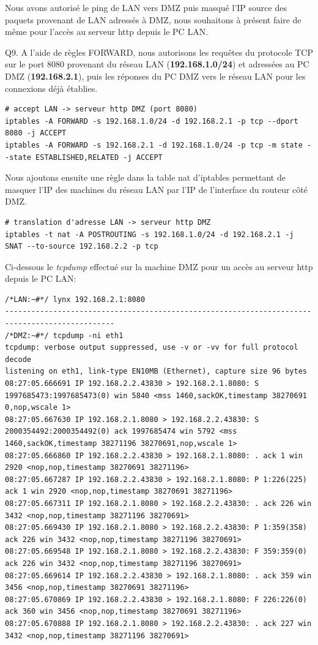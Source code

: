 \documentclass[frenchb, 11pt]{article}
\newlength{\leftbarwidth}
\newlength{\leftbarsep}
\newcommand*{\leftbarcolorcmd}{\color{leftbarcolor}} %
\renewenvironment{leftbar}{%
    \def\FrameCommand{{\leftbarcolorcmd{\vrule width \leftbarwidth\relax\hspace {\leftbarsep}}}}%
    \MakeFramed {\advance \hsize -\width \FrameRestore }%
}{%
    \endMakeFramed
}
\begin{document}
Nous avons autorisé le ping de LAN vers DMZ puis masqué l'IP source des paquets provenant de LAN adressés à DMZ, nous souhaitons à présent faire de même pour l'accès au serveur http depuis le PC LAN.

\begin{leftbar}
	\noindent Q9. A l'aide de règles FORWARD, nous autorisons les requêtes du protocole TCP sur le port 8080 provenant du réseau LAN (\textbf{192.168.1.0/24}) et adressées au PC DMZ (\textbf{192.168.2.1}), puis les réponses du PC DMZ vers le réseau LAN pour les connexions déjà établies.
	\begin{lstlisting}[numbers=none]
# accept LAN -> serveur http DMZ (port 8080)
iptables -A FORWARD -s 192.168.1.0/24 -d 192.168.2.1 -p tcp --dport 8080 -j ACCEPT
iptables -A FORWARD -s 192.168.2.1 -d 192.168.1.0/24 -p tcp -m state --state ESTABLISHED,RELATED -j ACCEPT
	\end{lstlisting}
	Nous ajoutons ensuite une règle dans la table nat d'iptables permettant de masquer l'IP des machines du réseau LAN par l'IP de l'interface du routeur côté DMZ.
	\begin{lstlisting}[numbers=none]
# translation d'adresse LAN -> serveur http DMZ
iptables -t nat -A POSTROUTING -s 192.168.1.0/24 -d 192.168.2.1 -j SNAT --to-source 192.168.2.2 -p tcp
	\end{lstlisting}
	Ci-dessous le \emph{tcpdump} effectué sur la machine DMZ pour un accès au serveur http depuis le PC LAN:
	\begin{lstlisting}[numbers=none]
/*LAN:~#*/ lynx 192.168.2.1:8080
-----------------------------------------------------------------------------------------------
/*DMZ:~#*/ tcpdump -ni eth1
tcpdump: verbose output suppressed, use -v or -vv for full protocol decode
listening on eth1, link-type EN10MB (Ethernet), capture size 96 bytes
08:27:05.666691 IP 192.168.2.2.43830 > 192.168.2.1.8080: S 1997685473:1997685473(0) win 5840 <mss 1460,sackOK,timestamp 38270691 0,nop,wscale 1>
08:27:05.667630 IP 192.168.2.1.8080 > 192.168.2.2.43830: S 2000354492:2000354492(0) ack 1997685474 win 5792 <mss 1460,sackOK,timestamp 38271196 38270691,nop,wscale 1>
08:27:05.666860 IP 192.168.2.2.43830 > 192.168.2.1.8080: . ack 1 win 2920 <nop,nop,timestamp 38270691 38271196>
08:27:05.667287 IP 192.168.2.2.43830 > 192.168.2.1.8080: P 1:226(225) ack 1 win 2920 <nop,nop,timestamp 38270691 38271196>
08:27:05.667311 IP 192.168.2.1.8080 > 192.168.2.2.43830: . ack 226 win 3432 <nop,nop,timestamp 38271196 38270691>
08:27:05.669430 IP 192.168.2.1.8080 > 192.168.2.2.43830: P 1:359(358) ack 226 win 3432 <nop,nop,timestamp 38271196 38270691>
08:27:05.669548 IP 192.168.2.1.8080 > 192.168.2.2.43830: F 359:359(0) ack 226 win 3432 <nop,nop,timestamp 38271196 38270691>
08:27:05.669614 IP 192.168.2.2.43830 > 192.168.2.1.8080: . ack 359 win 3456 <nop,nop,timestamp 38270691 38271196>
08:27:05.670869 IP 192.168.2.2.43830 > 192.168.2.1.8080: F 226:226(0) ack 360 win 3456 <nop,nop,timestamp 38270691 38271196>
08:27:05.670888 IP 192.168.2.1.8080 > 192.168.2.2.43830: . ack 227 win 3432 <nop,nop,timestamp 38271196 38270691>

	\end{lstlisting}
\end{leftbar}
\end{document}
